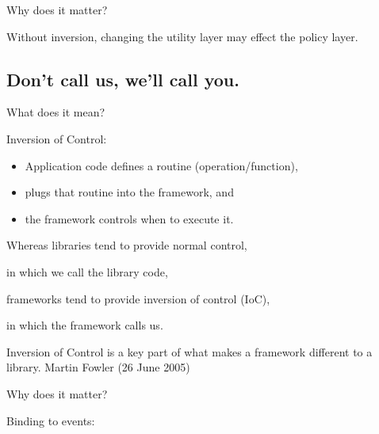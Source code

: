 \documentclass{beamer}
\begin{document}
\begin{frame}{Why does it matter?}
    \par Without inversion, changing the utility layer may effect the policy layer. 
\end{frame}

\begin{frame}{}
    
\end{frame}

\begin{frame}{}
    
\end{frame}

\subsection{Don't call us, we'll call you.}

\begin{frame}{What does it mean?}
    \par Inversion of Control: 
    \begin{itemize}
        \item Application code defines a routine (operation/function),
        \item plugs that routine into the framework, and 
        \item the framework controls when to execute it.
    \end{itemize}
    \par Whereas libraries tend to provide normal control, 
    \par in which we call the library code,
    \par frameworks tend to provide inversion of control (IoC),
    \par in which the framework calls us.
\end{frame}

\begin{frame}
Inversion of Control is a key part of what makes a framework different to a library.
Martin Fowler (26 June 2005)
\end{frame}

\begin{frame}{Why does it matter?}
\end{frame}

\begin{frame}{Binding to events:}
    
\end{frame}
\end{document}
